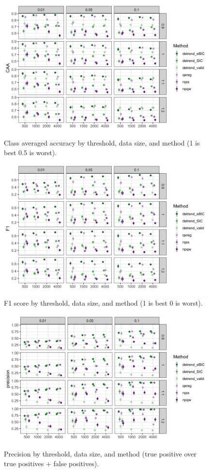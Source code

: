 \documentclass[12pt]{article}
\begin{document}
	\begin{figure}[h!]
		\caption{Class averaged accuracy by threshold, data size, and method (1 is best 0.5 is worst).}
		\includegraphics[width = \linewidth]{Figures/peaks_CAA.png}
	\end{figure}
	 
	\begin{figure}[h!]
		\caption{F1 score by threshold, data size, and method (1 is best 0 is worst).}
		\includegraphics[width = \linewidth]{Figures/peaks_F1.png}
	\end{figure}

	\begin{figure}[h!]
		\caption{Precision by threshold, data size, and method (true positive over true positives + false positives).}
		\includegraphics[width = \linewidth]{Figures/peaks_precision.png}
	\end{figure}
\end{document}
